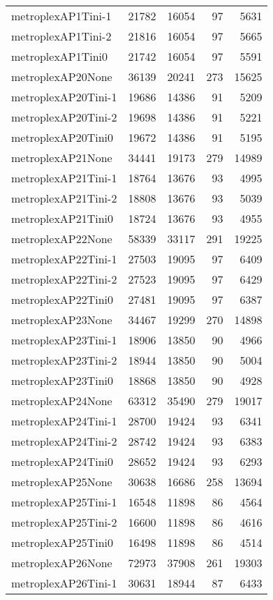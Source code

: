 \begin{longtable}{lrrrr}
metroplexAP1Tini-1 & 21782 & 16054 & 97 & 5631 \\
metroplexAP1Tini-2 & 21816 & 16054 & 97 & 5665 \\
metroplexAP1Tini0 & 21742 & 16054 & 97 & 5591 \\
metroplexAP20None & 36139 & 20241 & 273 & 15625 \\
metroplexAP20Tini-1 & 19686 & 14386 & 91 & 5209 \\
metroplexAP20Tini-2 & 19698 & 14386 & 91 & 5221 \\
metroplexAP20Tini0 & 19672 & 14386 & 91 & 5195 \\
metroplexAP21None & 34441 & 19173 & 279 & 14989 \\
metroplexAP21Tini-1 & 18764 & 13676 & 93 & 4995 \\
metroplexAP21Tini-2 & 18808 & 13676 & 93 & 5039 \\
metroplexAP21Tini0 & 18724 & 13676 & 93 & 4955 \\
metroplexAP22None & 58339 & 33117 & 291 & 19225 \\
metroplexAP22Tini-1 & 27503 & 19095 & 97 & 6409 \\
metroplexAP22Tini-2 & 27523 & 19095 & 97 & 6429 \\
metroplexAP22Tini0 & 27481 & 19095 & 97 & 6387 \\
metroplexAP23None & 34467 & 19299 & 270 & 14898 \\
metroplexAP23Tini-1 & 18906 & 13850 & 90 & 4966 \\
metroplexAP23Tini-2 & 18944 & 13850 & 90 & 5004 \\
metroplexAP23Tini0 & 18868 & 13850 & 90 & 4928 \\
metroplexAP24None & 63312 & 35490 & 279 & 19017 \\
metroplexAP24Tini-1 & 28700 & 19424 & 93 & 6341 \\
metroplexAP24Tini-2 & 28742 & 19424 & 93 & 6383 \\
metroplexAP24Tini0 & 28652 & 19424 & 93 & 6293 \\
metroplexAP25None & 30638 & 16686 & 258 & 13694 \\
metroplexAP25Tini-1 & 16548 & 11898 & 86 & 4564 \\
metroplexAP25Tini-2 & 16600 & 11898 & 86 & 4616 \\
metroplexAP25Tini0 & 16498 & 11898 & 86 & 4514 \\
metroplexAP26None & 72973 & 37908 & 261 & 19303 \\
metroplexAP26Tini-1 & 30631 & 18944 & 87 & 6433 \\

\end{longtable}
